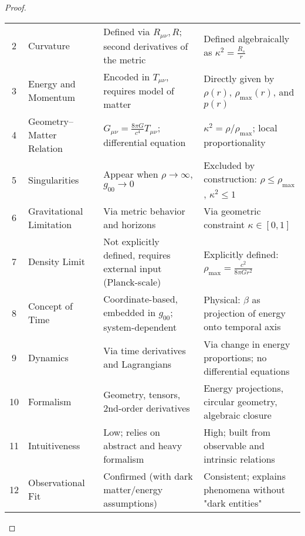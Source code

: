 \documentclass{article}
\begin{document}
\begin{proof}
\begin{tabularx}{\textwidth}{@{}clXX@{}}
2 & Curvature & 
Defined via \( R_{\mu\nu}, R \); second derivatives of the metric & 
Defined algebraically as \( \kappa^2 = \frac{R_s}{r} \) \\
\addlinespace

3 & Energy and Momentum & 
Encoded in \( T_{\mu\nu} \), requires model of matter & 
Directly given by \( \rho(r) \), \( \rho_{\text{max}}(r) \), and \( p(r) \) \\
\addlinespace

4 & Geometry–Matter Relation & 
\( G_{\mu\nu} = \frac{8\pi G}{c^4} T_{\mu\nu} \); differential equation & 
\( \kappa^2 = \rho / \rho_{\text{max}} \); local proportionality \\
\addlinespace

5 & Singularities & 
Appear when \( \rho \to \infty \), \( g_{00} \to 0 \) & 
Excluded by construction: \( \rho \leq \rho_{\text{max}} \), \( \kappa^2 \leq 1 \) \\
\addlinespace

6 & Gravitational Limitation & 
Via metric behavior and horizons & 
Via geometric constraint \( \kappa \in [0,1] \) \\
\addlinespace

7 & Density Limit & 
Not explicitly defined, requires external input (Planck-scale) & 
Explicitly defined: \( \rho_{\text{max}} = \frac{c^2}{8\pi G r^2} \) \\
\addlinespace

8 & Concept of Time & 
Coordinate-based, embedded in \( g_{00} \); system-dependent & 
Physical: \( \beta \) as projection of energy onto temporal axis \\
\addlinespace

9 & Dynamics & 
Via time derivatives and Lagrangians & 
Via change in energy proportions; no differential equations \\
\addlinespace

10 & Formalism & 
Geometry, tensors, 2nd-order derivatives & 
Energy projections, circular geometry, algebraic closure \\
\addlinespace

11 & Intuitiveness & 
Low; relies on abstract and heavy formalism & 
High; built from observable and intrinsic relations \\
\addlinespace

12 & Observational Fit & 
Confirmed (with dark matter/energy assumptions) & 
Consistent; explains phenomena without "dark entities" \\
\bottomrule
\end{tabularx}


\end{proof}
\end{document}
